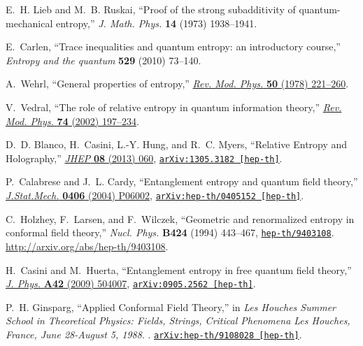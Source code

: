 \begin{thebibliography}{100}
E.~H. Lieb and M.~B. Ruskai, ``Proof of the strong subadditivity of
  quantum-mechanical entropy,''
{\em J. Math. Phys.} {\bf 14} (1973)  1938--1941.

E.~Carlen, ``Trace inequalities and quantum entropy: an introductory course,''
  {\em Entropy and the quantum} {\bf 529} (2010)  73--140.

A.~Wehrl, ``{General properties of entropy},''
\href{http://dx.doi.org/10.1103/RevModPhys.50.221}{{\em Rev. Mod. Phys.} {\bf
  50} (1978)  221--260}.

V.~Vedral, ``{The role of relative entropy in quantum information theory},''
\href{http://dx.doi.org/10.1103/RevModPhys.74.197}{{\em Rev. Mod. Phys.} {\bf
  74} (2002)  197--234}.

D.~D. Blanco, H.~Casini, L.-Y. Hung, and R.~C. Myers, ``{Relative Entropy and
  Holography},'' \href{http://dx.doi.org/10.1007/JHEP08(2013)060}{{\em JHEP}
  {\bf 08} (2013)  060},
\href{http://arxiv.org/abs/1305.3182}{{\tt arXiv:1305.3182 [hep-th]}}.

P.~Calabrese and J.~L. Cardy, ``{Entanglement entropy and quantum field
  theory},'' \href{http://dx.doi.org/10.1088/1742-5468/2004/06/P06002}{{\em
  J.Stat.Mech.} {\bf 0406} (2004)  P06002},
\href{http://arxiv.org/abs/hep-th/0405152}{{\tt arXiv:hep-th/0405152
  [hep-th]}}.

C.~Holzhey, F.~Larsen, and F.~Wilczek, ``Geometric and renormalized entropy in
  conformal field theory,'' {\em Nucl. Phys.} {\bf B424} (1994)  443--467,
  \href{http://arxiv.org/abs/hep-th/9403108}{{\tt hep-th/9403108}}.
\url{http://arxiv.org/abs/hep-th/9403108}.

H.~Casini and M.~Huerta, ``{Entanglement entropy in free quantum field
  theory},'' \href{http://dx.doi.org/10.1088/1751-8113/42/50/504007}{{\em J.
  Phys.} {\bf A42} (2009)  504007},
\href{http://arxiv.org/abs/0905.2562}{{\tt arXiv:0905.2562 [hep-th]}}.

P.~H. Ginsparg, ``{Applied Conformal Field Theory},'' in {\em {Les Houches
  Summer School in Theoretical Physics: Fields, Strings, Critical Phenomena Les
  Houches, France, June 28-August 5, 1988}}.
.
\newblock
\href{http://arxiv.org/abs/hep-th/9108028}{{\tt arXiv:hep-th/9108028
  [hep-th]}}.
\newblock


\end{thebibliography}
